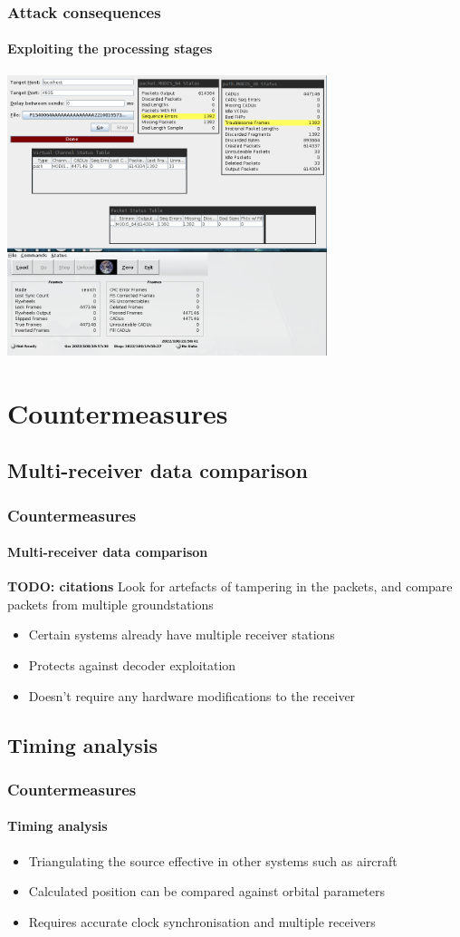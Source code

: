 \documentclass{beamer}
\begin{document}
\begin{frame}
  \frametitle{Attack consequences}
  \framesubtitle{Exploiting the processing stages}
  \centering
  \includegraphics[width=0.7\textwidth]{images/rtstps_incorrect.png}
\end{frame}

\section{Countermeasures}
\subsection{Multi-receiver data comparison}
\begin{frame}
  \frametitle{Countermeasures}
  \framesubtitle{Multi-receiver data comparison}
  \textbf{TODO: citations}
  Look for artefacts of tampering in the packets, and compare packets from multiple groundstations

  \begin{itemize}
    \item Certain systems already have multiple receiver stations
    \item Protects against decoder exploitation
    \item Doesn't require any hardware modifications to the receiver
  \end{itemize}
\end{frame}

\subsection{Timing analysis}
\begin{frame}
  \frametitle{Countermeasures}
  \framesubtitle{Timing analysis}

  \begin{itemize}
    \item Triangulating the source effective in other systems such as aircraft
    \item Calculated position can be compared against orbital parameters
    \item Requires accurate clock synchronisation and multiple receivers
  \end{itemize}
\end{frame}
\end{document}
